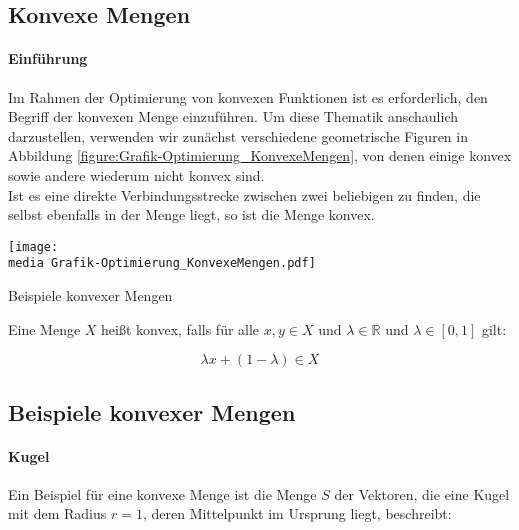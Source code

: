 \subsection{Konvexe Mengen}

\paragraph{Einführung}

Im Rahmen der Optimierung von konvexen Funktionen ist es erforderlich, den Begriff der konvexen Menge einzuführen. Um diese Thematik anschaulich darzustellen, verwenden wir zunächst verschiedene geometrische Figuren in Abbildung \ref{figure:Grafik-Optimierung_KonvexeMengen}, von denen einige konvex sowie andere wiederum nicht konvex sind. \\
Ist es eine direkte Verbindungsstrecke zwischen zwei beliebigen zu finden, die selbst ebenfalls in der Menge liegt, so ist die Menge konvex.

\begin{dsafigure}
\begin{center}
\texttt{[image: \\media Grafik-Optimierung\_KonvexeMengen.pdf]}
\label{figure:Grafik-Optimierung_KonvexeMengen}
\caption{Beispiele konvexer Mengen}
\end{center}
\end{dsafigure}

\begin{Def}

Eine Menge $X$ heißt konvex, falls für alle $x, y \in X$ und $\lambda \in \mathbb{R}$ und $\lambda \in [0,1]$ gilt:

\begin{equation}
\lambda x + (1 - \lambda) \in X
\end{equation}

\end{Def}

\subsection{Beispiele konvexer Mengen}

\paragraph{Kugel}

Ein Beispiel für eine konvexe Menge ist die Menge $S$ der Vektoren, die eine Kugel mit dem Radius $r = 1$, deren Mittelpunkt im Ursprung liegt, beschreibt:

